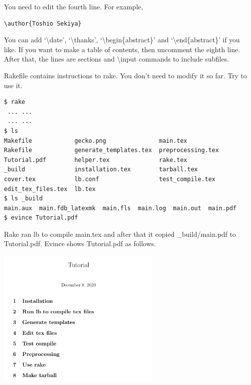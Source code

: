 You need to edit the fourth line.
For example,
\begin{verbatim}
\author{Toshio Sekiya}
\end{verbatim}
You can add `{\textbackslash}date', `{\textbackslash}thanks', `{\textbackslash}begin\{abstract\}' and `{\textbackslash}end\{abstract\}' if you like.
If you want to make a table of contents, then uncomment the eighth line.
After that, the lines are sections and {\textbackslash}input commands to include subfiles.

Rakefile contains instructions to rake.
You don't need to modify it so far.
Try to use it.
\begin{verbatim}
$ rake
 ... ...
 ... ...
$ ls
Makefile            gecko.png               main.tex
Rakefile            generate_templates.tex  preprocessing.tex
Tutorial.pdf        helper.tex              rake.tex
_build              installation.tex        tarball.tex
cover.tex           lb.conf                 test_compile.tex
edit_tex_files.tex  lb.tex
$ ls _build
main.aux  main.fdb_latexmk  main.fls  main.log  main.out  main.pdf
$ evince Tutorial.pdf
\end{verbatim}
Rake ran lb to compile main.tex and after that it copied \_build/main.pdf to Tutorial.pdf.
Evince shows Tutorial.pdf as follows.
\begin{center}
\includegraphics[width=8cm]{Tutorial_1.png}
\end{center}

